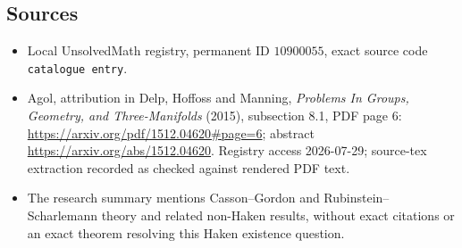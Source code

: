 \documentclass[11pt]{article}
\begin{document}
\subsection{Sources}
\begin{itemize}
\item Local UnsolvedMath registry, permanent ID \(10900055\), exact source code \texttt{catalogue entry}.
\item Agol, attribution in Delp, Hoffoss and Manning, \emph{Problems In Groups, Geometry, and Three-Manifolds} (2015), subsection 8.1, PDF page 6: \url{https://arxiv.org/pdf/1512.04620#page=6}; abstract \url{https://arxiv.org/abs/1512.04620}. Registry access 2026-07-29; source-tex extraction recorded as checked against rendered PDF text.
\item The research summary mentions Casson--Gordon and Rubinstein--Scharlemann theory and related non-Haken results, without exact citations or an exact theorem resolving this Haken existence question.
\end{itemize}
\end{document}

